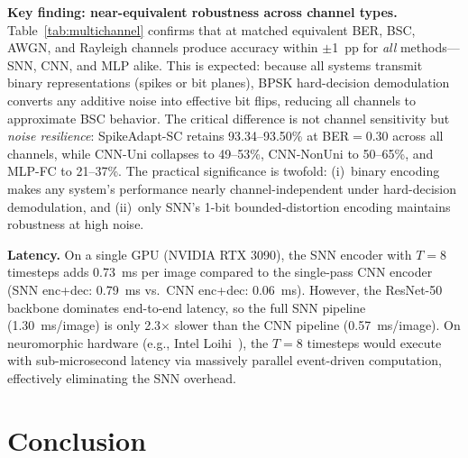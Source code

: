 \documentclass[conference]{IEEEtran}
\begin{document}
\textbf{Key finding: near-equivalent robustness across channel types.} Table~\ref{tab:multichannel} confirms that at matched equivalent BER, BSC, AWGN, and Rayleigh channels produce accuracy within $\pm$1~pp for \emph{all} methods---SNN, CNN, and MLP alike. This is expected: because all systems transmit binary representations (spikes or bit planes), BPSK hard-decision demodulation converts any additive noise into effective bit flips, reducing all channels to approximate BSC behavior. The critical difference is not channel sensitivity but \emph{noise resilience}: SpikeAdapt-SC retains 93.34--93.50\% at BER${=}0.30$ across all channels, while CNN-Uni collapses to 49--53\%, CNN-NonUni to 50--65\%, and MLP-FC to 21--37\%. The practical significance is twofold: (i)~binary encoding makes any system's performance nearly channel-independent under hard-decision demodulation, and (ii)~only SNN's 1-bit bounded-distortion encoding maintains robustness at high noise.

\textbf{Latency.} On a single GPU (NVIDIA RTX 3090), the SNN encoder with $T{=}8$ timesteps adds 0.73~ms per image compared to the single-pass CNN encoder (SNN enc+dec: 0.79~ms vs.\ CNN enc+dec: 0.06~ms). However, the ResNet-50 backbone dominates end-to-end latency, so the full SNN pipeline (1.30~ms/image) is only 2.3$\times$ slower than the CNN pipeline (0.57~ms/image). On neuromorphic hardware (e.g., Intel Loihi~\cite{davies2018loihi}), the $T{=}8$ timesteps would execute with sub-microsecond latency via massively parallel event-driven computation, effectively eliminating the SNN overhead.

\section{Conclusion}
\label{sec:conclusion}
\end{document}
